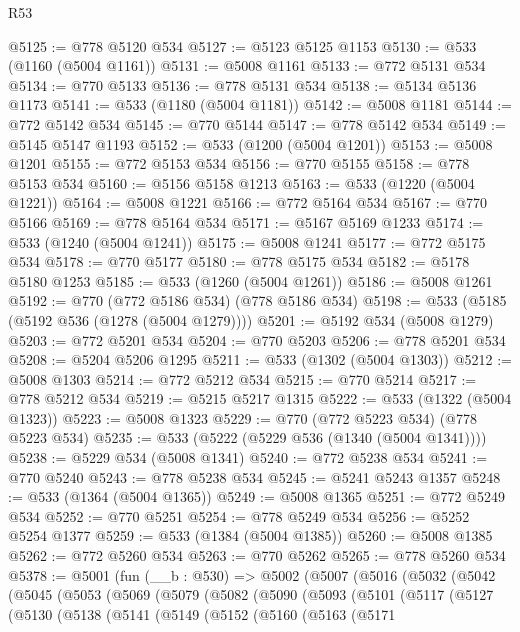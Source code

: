 \begin{lexlean}{R53}
\begin{coremodule}
@5125 := @778 @5120 @534
@5127 := @5123 @5125 @1153
@5130 := @533 (@1160 (@5004 @1161))
@5131 := @5008 @1161
@5133 := @772 @5131 @534
@5134 := @770 @5133
@5136 := @778 @5131 @534
@5138 := @5134 @5136 @1173
@5141 := @533 (@1180 (@5004 @1181))
@5142 := @5008 @1181
@5144 := @772 @5142 @534
@5145 := @770 @5144
@5147 := @778 @5142 @534
@5149 := @5145 @5147 @1193
@5152 := @533 (@1200 (@5004 @1201))
@5153 := @5008 @1201
@5155 := @772 @5153 @534
@5156 := @770 @5155
@5158 := @778 @5153 @534
@5160 := @5156 @5158 @1213
@5163 := @533 (@1220 (@5004 @1221))
@5164 := @5008 @1221
@5166 := @772 @5164 @534
@5167 := @770 @5166
@5169 := @778 @5164 @534
@5171 := @5167 @5169 @1233
@5174 := @533 (@1240 (@5004 @1241))
@5175 := @5008 @1241
@5177 := @772 @5175 @534
@5178 := @770 @5177
@5180 := @778 @5175 @534
@5182 := @5178 @5180 @1253
@5185 := @533 (@1260 (@5004 @1261))
@5186 := @5008 @1261
@5192 := @770 (@772 @5186 @534) (@778 @5186 @534)
@5198 := @533 (@5185 (@5192 @536 (@1278 (@5004 @1279))))
@5201 := @5192 @534 (@5008 @1279)
@5203 := @772 @5201 @534
@5204 := @770 @5203
@5206 := @778 @5201 @534
@5208 := @5204 @5206 @1295
@5211 := @533 (@1302 (@5004 @1303))
@5212 := @5008 @1303
@5214 := @772 @5212 @534
@5215 := @770 @5214
@5217 := @778 @5212 @534
@5219 := @5215 @5217 @1315
@5222 := @533 (@1322 (@5004 @1323))
@5223 := @5008 @1323
@5229 := @770 (@772 @5223 @534) (@778 @5223 @534)
@5235 := @533 (@5222 (@5229 @536 (@1340 (@5004 @1341))))
@5238 := @5229 @534 (@5008 @1341)
@5240 := @772 @5238 @534
@5241 := @770 @5240
@5243 := @778 @5238 @534
@5245 := @5241 @5243 @1357
@5248 := @533 (@1364 (@5004 @1365))
@5249 := @5008 @1365
@5251 := @772 @5249 @534
@5252 := @770 @5251
@5254 := @778 @5249 @534
@5256 := @5252 @5254 @1377
@5259 := @533 (@1384 (@5004 @1385))
@5260 := @5008 @1385
@5262 := @772 @5260 @534
@5263 := @770 @5262
@5265 := @778 @5260 @534
@5378 := @5001
    (fun (__b : @530) =>
    @5002
      (@5007
        (@5016
          (@5032
            (@5042
              (@5045
                (@5053
                  (@5069
                    (@5079
                      (@5082
                        (@5090
                          (@5093
                            (@5101
                              (@5117
                                (@5127
                                  (@5130
                                    (@5138
                                      (@5141
                                        (@5149
                                          (@5152
                                            (@5160
                                              (@5163
                                                (@5171

\end{coremodule}
\end{lexlean}
